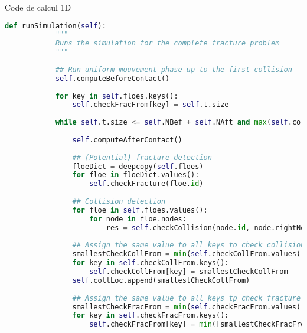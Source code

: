 \begin{frame}[fragile]{Code de calcul 1D}
    \scriptsize
    \begin{lstlisting}[language=Python,breaklines,caption={Code de simulation 1D},captionpos=b,label={code}]
        def runSimulation(self):
            """
            Runs the simulation for the complete fracture problem
            """
    
            ## Run uniform mouvement phase up to the first collision
            self.computeBeforeContact()
    
            for key in self.floes.keys():
                self.checkFracFrom[key] = self.t.size
    
            while self.t.size <= self.NBef + self.NAft and max(self.collCount.values()) < 1000:
    
                self.computeAfterContact()
    
                ## (Potential) fracture detection 
                floeDict = deepcopy(self.floes)
                for floe in floeDict.values():
                    self.checkFracture(floe.id)
    
                ## Collision detection 
                for floe in self.floes.values():
                    for node in floe.nodes:
                        res = self.checkCollision(node.id, node.rightNode)
    
                ## Assign the same value to all keys to check collision from now on
                smallestCheckCollFrom = min(self.checkCollFrom.values())
                for key in self.checkCollFrom.keys():
                    self.checkCollFrom[key] = smallestCheckCollFrom
                self.collLoc.append(smallestCheckCollFrom)
    
                ## Assign the same value to all keys tp check fracture from now on
                smallestCheckFracFrom = min(self.checkFracFrom.values())
                for key in self.checkFracFrom.keys():
                    self.checkFracFrom[key] = min([smallestCheckFracFrom, smallestCheckCollFrom])
    \end{lstlisting}
    \normalsize
\end{frame}
    
    

